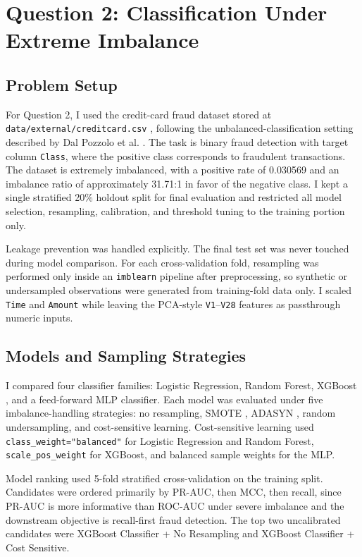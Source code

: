 \section{Question 2: Classification Under Extreme Imbalance}

\subsection{Problem Setup}

For Question 2, I used the credit-card fraud dataset stored at \texttt{data/external/creditcard.csv} \cite{ulbCreditCardFraud}, following the unbalanced-classification setting described by Dal Pozzolo et al. \cite{dalpozzolo2015calibrating}. The task is binary fraud detection with target column \texttt{Class}, where the positive class corresponds to fraudulent transactions. The dataset is extremely imbalanced, with a positive rate of 0.030569 and an imbalance ratio of approximately 31.71:1 in favor of the negative class. I kept a single stratified 20\% holdout split for final evaluation and restricted all model selection, resampling, calibration, and threshold tuning to the training portion only.

Leakage prevention was handled explicitly. The final test set was never touched during model comparison. For each cross-validation fold, resampling was performed only inside an \texttt{imblearn} pipeline after preprocessing, so synthetic or undersampled observations were generated from training-fold data only. I scaled \texttt{Time} and \texttt{Amount} while leaving the PCA-style \texttt{V1}--\texttt{V28} features as passthrough numeric inputs.

\subsection{Models and Sampling Strategies}

I compared four classifier families: Logistic Regression, Random Forest, XGBoost \cite{chen2016xgboost}, and a feed-forward MLP classifier. Each model was evaluated under five imbalance-handling strategies: no resampling, SMOTE \cite{chawla2002smote}, ADASYN \cite{he2008adasyn}, random undersampling, and cost-sensitive learning. Cost-sensitive learning used \texttt{class\_weight="balanced"} for Logistic Regression and Random Forest, \texttt{scale\_pos\_weight} for XGBoost, and balanced sample weights for the MLP.

Model ranking used 5-fold stratified cross-validation on the training split. Candidates were ordered primarily by PR-AUC, then MCC, then recall, since PR-AUC is more informative than ROC-AUC under severe imbalance and the downstream objective is recall-first fraud detection. The top two uncalibrated candidates were XGBoost Classifier + No Resampling and XGBoost Classifier + Cost Sensitive.

